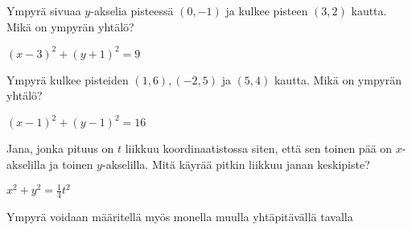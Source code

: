 \begin{tehtavasivu}
\begin{tehtava}
Ympyrä sivuaa $y$-akselia pisteessä $(0, -1)$ ja kulkee pisteen $(3, 2)$ kautta. Mikä on ympyrän yhtälö?
\begin{vastaus}
$(x-3)^2+(y+1)^2=9$
\end{vastaus}
\end{tehtava}

\begin{tehtava}
Ympyrä kulkee pisteiden $(1, 6), (-2, 5)$ ja $(5, 4)$ kautta. Mikä on ympyrän yhtälö?
\begin{vastaus}
$(x-1)^2+(y-1)^2=16$
\end{vastaus}
\end{tehtava}

\begin{tehtava}
Jana, jonka pituus on $t$ liikkuu koordinaatistossa siten, että sen toinen pää on $x$-akselilla ja toinen $y$-akselilla. Mitä käyrää pitkin liikkuu janan keskipiste?
\begin{vastaus}
$x^2+y^2=\frac{1}{4}t^2$
\end{vastaus}
\end{tehtava}

\begin{tehtava}
Ympyrä voidaan määritellä myös monella muulla yhtäpitävällä tavalla
\begin{alakohdat}
\end{alakohdat}
\begin{vastaus}
\begin{alakohdat}
\end{alakohdat}
\end{vastaus}
\end{tehtava}

\end{tehtavasivu}